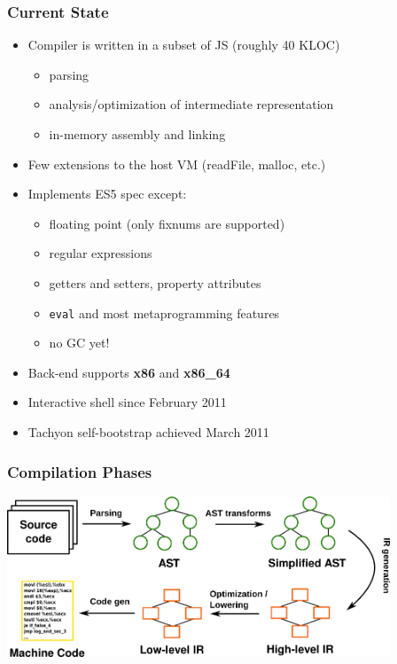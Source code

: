 \begin{frame}
\frametitle{\bf Current State}

  \begin{itemize}

  \item Compiler is written in a subset of JS (roughly 40 KLOC)
    \begin{itemize}
    \item parsing
    \item analysis/optimization of intermediate representation
    \item in-memory assembly and linking
    \end{itemize}
    \smallskip

  \item Few extensions to the host VM (readFile, malloc, etc.)
    \smallskip

  \item Implements ES5 spec except:
    \begin{itemize}
    \item floating point (only fixnums are supported)
    \item regular expressions
    \item getters and setters, property attributes
    \item {\tt eval} and most metaprogramming features
    \item no GC yet!
    \end{itemize}
    \smallskip

  \item Back-end supports {\bf x86} and {\bf x86\_64}
    \smallskip

  \item Interactive shell since February 2011
    \smallskip

  \item Tachyon self-bootstrap achieved March 2011
    \smallskip

  \end{itemize}
\end{frame}

%
%
\begin{frame}
\frametitle{\bf Compilation Phases}
\begin{center}
\includegraphics[width=4.5in]{images/phases}
\end{center}
\end{frame}

